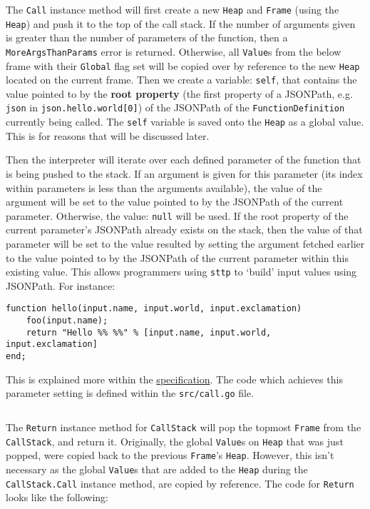 The \verb|Call| instance method will first create a new \verb|Heap| and \verb|Frame| (using the \verb|Heap|) and push it to the top of the call stack. If the number of arguments given is greater than the number of parameters of the function, then a \verb|MoreArgsThanParams| error is returned. Otherwise, all \verb|Value|s from the below frame with their \verb|Global| flag set will be copied over by reference to the new \verb|Heap| located on the current frame. Then we create a variable: \verb|self|, that contains the value pointed to by the \textbf{root property} (the first property of a JSONPath, e.g. \verb|json| in \verb|json.hello.world[0]|) of the JSONPath of the \verb|FunctionDefinition| currently being called. The \verb|self| variable is saved onto the \verb|Heap| as a global value. This is for reasons that will be discussed later.

Then the interpreter will iterate over each defined parameter of the function that is being pushed to the stack. If an argument is given for this parameter (its index within parameters is less than the arguments available), the value of the argument will be set to the value pointed to by the JSONPath of the current parameter. Otherwise, the value: \verb|null| will be used. If the root property of the current parameter's JSONPath already exists on the stack, then the value of that parameter will be set to the value resulted by setting the argument fetched earlier to the value pointed to by the JSONPath of the current parameter within this existing value. This allows programmers using \verb|sttp| to `build' input values using JSONPath. For instance:

\begin{verbatim}
function hello(input.name, input.world, input.exclamation)
    foo(input.name);
    return "Hello %% %%" % [input.name, input.world, input.exclamation]
end;
\end{verbatim}

This is explained more within the \hyperref[sec:function-heap]{specification}. The code which achieves this parameter setting is defined within the \verb|src/call.go| file.

\inputminted[firstline=88, lastline=130, autogobble, breaklines, tabsize=4]{go}{../../src/call.go}

The \verb|Return| instance method for \verb|CallStack| will pop the topmost \verb|Frame| from the \verb|CallStack|, and return it. Originally, the global \verb|Value|s on \verb|Heap| that was just popped, were copied back to the previous \verb|Frame|'s \verb|Heap|. However, this isn't necessary as the global \verb|Value|s that are added to the \verb|Heap| during the \verb|CallStack.Call| instance method, are copied by reference. The code for \verb|Return| looks like the following:

